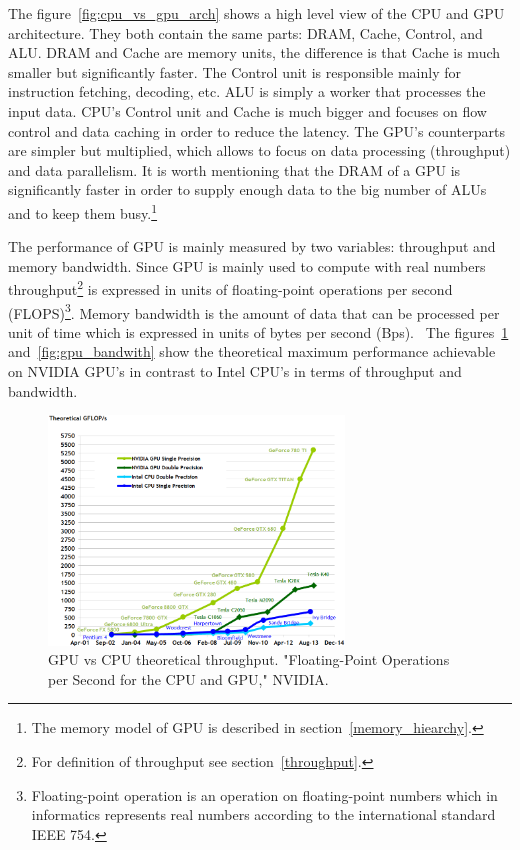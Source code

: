 \documentclass[12pt,oneside]{fithesis2}
\begin{document}
The figure~\ref{fig:cpu_vs_gpu_arch} shows a high level view of the CPU and GPU architecture. They both contain the same parts: DRAM, Cache, Control, and ALU. DRAM and Cache are memory units, the difference is that Cache is much smaller but significantly faster. The Control unit is responsible mainly for instruction fetching, decoding, etc. ALU is simply a worker that processes the input data. CPU's Control unit and Cache is much bigger and focuses on flow control and data caching in order to reduce the latency. The GPU's counterparts are simpler but multiplied, which allows to focus on data processing (throughput) and data parallelism. It is worth mentioning that the DRAM of a GPU is significantly faster in order to supply enough data to the big number of ALUs and to keep them busy.\footnote{The memory model of GPU is described in section~\ref{memory_hiearchy}.}

The performance of GPU is mainly measured by two variables: throughput and memory bandwidth. Since GPU is mainly used to compute with real numbers throughput\footnote{For definition of throughput see section~\ref{throughput}.} is expressed in units of floating-point operations per second (FLOPS)\footnote{Floating-point operation is an operation on floating-point numbers which in informatics represents real numbers according to the international standard IEEE 754.}. Memory bandwidth is the amount of data that can be processed per unit of time which is expressed in units of bytes per second (Bps).~\cite{professional_cuda} The figures~\ref{fig:gpu_throughput} and~\ref{fig:gpu_bandwith} show the theoretical maximum performance achievable on NVIDIA GPU's in contrast to Intel CPU's in terms of throughput and bandwidth.

\begin{figure}[H]
	\centering
	\includegraphics[width=0.7\textwidth]{figures/floating-point-operations-per-second.png}
	\caption{GPU vs CPU theoretical throughput. "Floating-Point Operations per Second for the CPU and GPU," NVIDIA.~\cite{cuda_guide}}
	\label{fig:gpu_throughput}
\end{figure}
\end{document}
